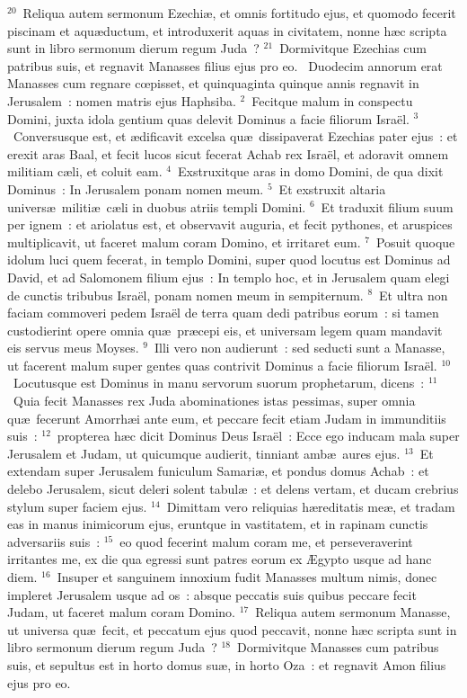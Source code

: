 ${}^{20}$~Reliqua autem sermonum Ezechi\ae , et omnis fortitudo ejus, et quomodo fecerit piscinam et aqu\ae ductum, et introduxerit aquas in civitatem, nonne h\ae c scripta sunt in libro sermonum dierum regum Juda~?
${}^{21}$~Dormivitque Ezechias cum patribus suis, et regnavit Manasses filius ejus pro eo.
~Duodecim annorum erat Manasses cum regnare cœpisset, et quinquaginta quinque annis regnavit in Jerusalem~: nomen matris ejus Haphsiba.
${}^{2}$~Fecitque malum in conspectu Domini, juxta idola gentium quas delevit Dominus a facie filiorum Isra\"el.
${}^{3}$~Conversusque est, et \ae dificavit excelsa qu\ae\ dissipaverat Ezechias pater ejus~: et erexit aras Baal, et fecit lucos sicut fecerat Achab rex Isra\"el, et adoravit omnem militiam c\ae li, et coluit eam.
${}^{4}$~Exstruxitque aras in domo Domini, de qua dixit Dominus~: In Jerusalem ponam nomen meum.
${}^{5}$~Et exstruxit altaria univers\ae\ militi\ae\ c\ae li in duobus atriis templi Domini.
${}^{6}$~Et traduxit filium suum per ignem~: et ariolatus est, et observavit auguria, et fecit pythones, et aruspices multiplicavit, ut faceret malum coram Domino, et irritaret eum.
${}^{7}$~Posuit quoque idolum luci quem fecerat, in templo Domini, super quod locutus est Dominus ad David, et ad Salomonem filium ejus~: In templo hoc, et in Jerusalem quam elegi de cunctis tribubus Isra\"el, ponam nomen meum in sempiternum.
${}^{8}$~Et ultra non faciam commoveri pedem Isra\"el de terra quam dedi patribus eorum~: si tamen custodierint opere omnia qu\ae\ pr\ae cepi eis, et universam legem quam mandavit eis servus meus Moyses.
${}^{9}$~Illi vero non audierunt~: sed seducti sunt a Manasse, ut facerent malum super gentes quas contrivit Dominus a facie filiorum Isra\"el.
${}^{10}$~Locutusque est Dominus in manu servorum suorum prophetarum, dicens~:
${}^{11}$~Quia fecit Manasses rex Juda abominationes istas pessimas, super omnia qu\ae\ fecerunt Amorrh\ae i ante eum, et peccare fecit etiam Judam in immunditiis suis~:
${}^{12}$~propterea h\ae c dicit Dominus Deus Isra\"el~: Ecce ego inducam mala super Jerusalem et Judam, ut quicumque audierit, tinniant amb\ae\ aures ejus.
${}^{13}$~Et extendam super Jerusalem funiculum Samari\ae , et pondus domus Achab~: et delebo Jerusalem, sicut deleri solent tabul\ae~: et delens vertam, et ducam crebrius stylum super faciem ejus.
${}^{14}$~Dimittam vero reliquias h\ae reditatis me\ae , et tradam eas in manus inimicorum ejus, eruntque in vastitatem, et in rapinam cunctis adversariis suis~:
${}^{15}$~eo quod fecerint malum coram me, et perseveraverint irritantes me, ex die qua egressi sunt patres eorum ex \AE gypto usque ad hanc diem.
${}^{16}$~Insuper et sanguinem innoxium fudit Manasses multum nimis, donec impleret Jerusalem usque ad os~: absque peccatis suis quibus peccare fecit Judam, ut faceret malum coram Domino.
${}^{17}$~Reliqua autem sermonum Manasse, ut universa qu\ae\ fecit, et peccatum ejus quod peccavit, nonne h\ae c scripta sunt in libro sermonum dierum regum Juda~?
${}^{18}$~Dormivitque Manasses cum patribus suis, et sepultus est in horto domus su\ae , in horto Oza~: et regnavit Amon filius ejus pro eo.


